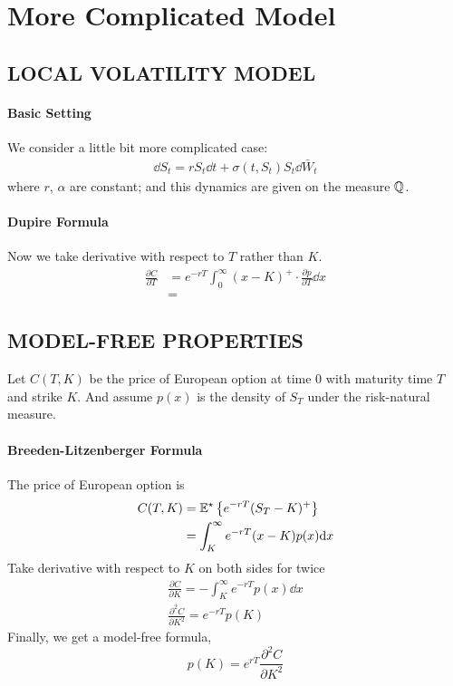 \section{More Complicated Model}

\subsection*{LOCAL VOLATILITY MODEL}
\paragraph{Basic Setting}
We consider a little bit more complicated case:
\begin{align*} 
\dd S_t = r S_t \dd t + \sigma(t, S_t) S_t \dd \bar{W}_t  
\end{align*}
where $r$, $\alpha$ are constant; and this dynamics are given on the measure $\mathbb{Q}$.


\paragraph{Dupire Formula} Now we take derivative with respect to $T$ rather than $K$.
\begin{align*}
\frac{\partial C}{\partial T} &= e^{-rT} \int^\infty_0 (x - K)^+ \cdot \frac{\partial p}{\partial T} \dd x \\
&= 
\end{align*} 

\subsection*{MODEL-FREE PROPERTIES}

Let $C(T,K)$ be the price of European option at time $0$ with maturity time $T$ and strike $K$. And assume $p(x)$ is the density of $S_T$ under the risk-natural measure. 

\paragraph{Breeden-Litzenberger Formula} The price of European option is
\begin{align*}
	C(T,K) &= \mathbb{E}^\star \left\{  e^{-rT}(S_T - K)^+ \right\} \\
	&= \int^\infty_K e^{-r T}(x - K) p(x) \mathrm{d} x
\end{align*}
Take derivative with respect to $K$ on both sides for twice
\begin{align*}
	\frac{\partial C}{\partial K} = -\int^\infty_K e^{-r T} p(x) \dd x \\
	\frac{\partial^2 C}{\partial K^2} =   e^{-r T} p(K) 
\end{align*}
Finally, we get a model-free formula,
$$p(K) = e^{r T} \frac{\partial^2 C}{\partial K^2}$$

